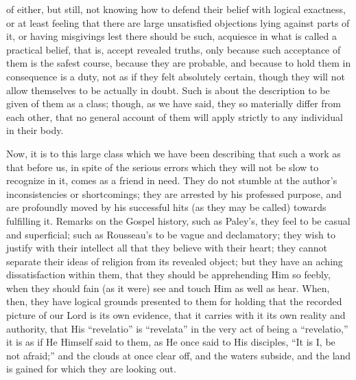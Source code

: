 of either, but still, not knowing how to defend their belief with
logical exactness, or at least feeling that there are large
unsatisfied objections lying against parts of it, or having misgivings
lest there should be such, acquiesce in what is called a practical
belief, that is, accept revealed truths, only because such acceptance
of them is the safest course, because they are probable, and because
to hold them in consequence is a duty, not as if they felt absolutely
certain, though they will not allow themselves to be actually in
doubt. Such is about the description to be given of them as a class;
though, as we have said, they so materially differ from each other,
that no general account of them will apply strictly to any individual
in their body.

Now, it is to this large class which we have been
describing that such a work as that before us, in spite of the serious
errors which they will not be slow to recognize in it, comes as a
friend in need. They do not stumble at the author's inconsistencies or
shortcomings; they are arrested by his professed purpose, and are
profoundly moved by his successful hits (as they may be called)
towards fulfilling it. Remarks on the Gospel history, such as Paley's,
they feel to be casual and superficial; such as Rousseau's to be
vague and declamatory; they wish to justify with their intellect all
that they believe with their heart; they cannot separate their ideas
of religion from its revealed object; but they have an aching
dissatisfaction within them, that they should be apprehending Him so
feebly, when they should fain (as it were) see and touch Him as well
as hear. When, then, they have logical grounds presented to them for
holding that the recorded picture of our Lord is its own evidence,
that it carries with it its own reality and authority, that His ``revelatio''
is ``revelata'' in the very act of being a ``revelatio,'' it is as if He
Himself said to them, as He once said to His disciples, ``It is I, be
not afraid;'' and the clouds at once clear off, and the waters subside,
and the land is gained for which they are looking out.

